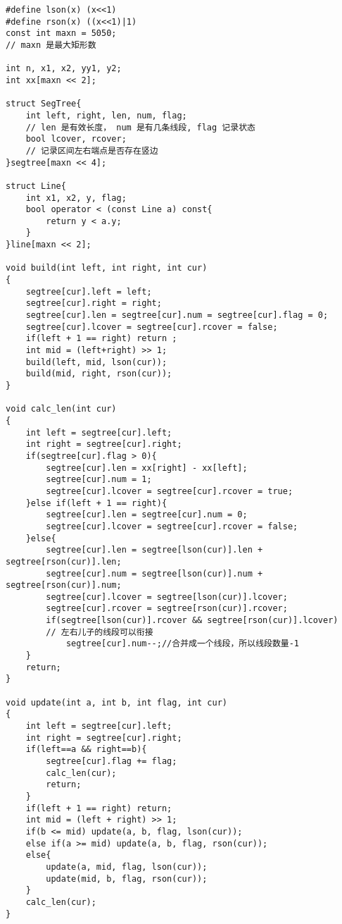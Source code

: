 \begin{lstlisting}
#define lson(x) (x<<1)
#define rson(x) ((x<<1)|1)
const int maxn = 5050;
// maxn 是最大矩形数

int n, x1, x2, yy1, y2;
int xx[maxn << 2];

struct SegTree{
    int left, right, len, num, flag;
    // len 是有效长度， num 是有几条线段, flag 记录状态
    bool lcover, rcover;
    // 记录区间左右端点是否存在竖边
}segtree[maxn << 4];

struct Line{
    int x1, x2, y, flag;
    bool operator < (const Line a) const{
        return y < a.y;
    }
}line[maxn << 2];

void build(int left, int right, int cur)
{
    segtree[cur].left = left;
    segtree[cur].right = right;
    segtree[cur].len = segtree[cur].num = segtree[cur].flag = 0;
    segtree[cur].lcover = segtree[cur].rcover = false;
    if(left + 1 == right) return ;
    int mid = (left+right) >> 1;
    build(left, mid, lson(cur));
    build(mid, right, rson(cur));
}

void calc_len(int cur)
{
    int left = segtree[cur].left;
    int right = segtree[cur].right;
    if(segtree[cur].flag > 0){
        segtree[cur].len = xx[right] - xx[left];
        segtree[cur].num = 1;
        segtree[cur].lcover = segtree[cur].rcover = true;
    }else if(left + 1 == right){
        segtree[cur].len = segtree[cur].num = 0;
        segtree[cur].lcover = segtree[cur].rcover = false;
    }else{
        segtree[cur].len = segtree[lson(cur)].len + segtree[rson(cur)].len;
        segtree[cur].num = segtree[lson(cur)].num + segtree[rson(cur)].num;
        segtree[cur].lcover = segtree[lson(cur)].lcover;
        segtree[cur].rcover = segtree[rson(cur)].rcover;
        if(segtree[lson(cur)].rcover && segtree[rson(cur)].lcover)
        // 左右儿子的线段可以衔接
            segtree[cur].num--;//合并成一个线段，所以线段数量-1
    }
    return;
}

void update(int a, int b, int flag, int cur)
{
    int left = segtree[cur].left;
    int right = segtree[cur].right;
    if(left==a && right==b){
        segtree[cur].flag += flag;
        calc_len(cur);
        return;
    }
    if(left + 1 == right) return;
    int mid = (left + right) >> 1;
    if(b <= mid) update(a, b, flag, lson(cur));
    else if(a >= mid) update(a, b, flag, rson(cur));
    else{
        update(a, mid, flag, lson(cur));
        update(mid, b, flag, rson(cur));
    }
    calc_len(cur);
}


\end{lstlisting}
